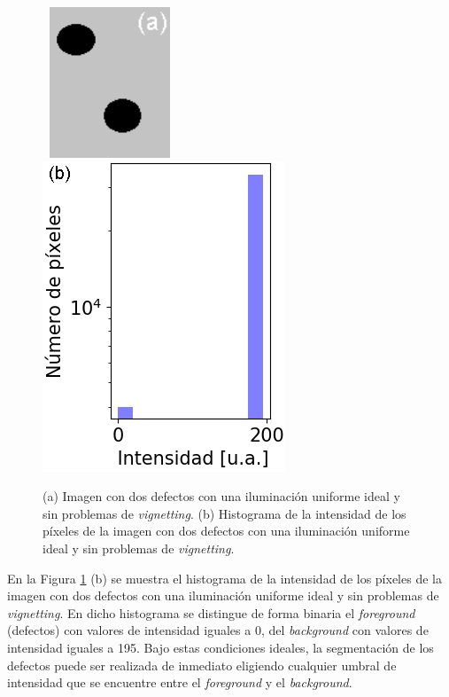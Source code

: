\begin{figure}[H]
\hfill%
\includegraphics[width=4.0cm,height=4.5cm]{Figs/defectosZEISS/img_ideal_2defectos.png}
\hfill%
\includegraphics[scale=0.7]{Figs/defectosZEISS/hist_bg_condefectos_teorico.png}
\hfill%
\hfill%
\caption{(a) Imagen con dos defectos con una iluminación uniforme ideal y sin problemas de \textit{vignetting}. (b) Histograma de la intensidad de los píxeles de la imagen con dos defectos con una iluminación uniforme ideal y sin problemas de \textit{vignetting}.}
\label{fig:2d}
\end{figure}
En la Figura \ref{fig:2d} (b) se muestra el histograma de la intensidad de los píxeles de la imagen con dos defectos con una iluminación uniforme ideal y sin problemas de \textit{vignetting}. En dicho histograma se distingue de forma binaria el \textit{foreground} (defectos) con valores de intensidad iguales a 0, del \textit{background} con valores de intensidad iguales a 195. Bajo estas condiciones ideales, la segmentación de los defectos puede ser realizada de inmediato eligiendo cualquier umbral de intensidad que se encuentre entre el \textit{foreground} y el \textit{background}. 


\singlespacing
